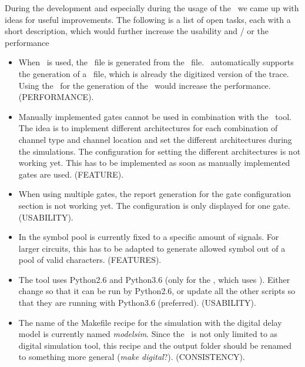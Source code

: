 During the development and especially during the usage of the \invt\, we came 
up with ideas for useful improvements. 
The following is a list of open tasks, each with a short description, which 
would further increase the usability and / or the performance

\begin{itemize}
	\item When \hspice\ is used, the \crossingsjson\ file is 
	generated from the \trfile\ file. \hspice\ automatically supports the 
	generation of a \vcdfile\ file, which is already the digitized version of 
	the trace. Using the \vcdfile\ for the generation of the \crossingsjson\ 
	would increase the performance. (PERFORMANCE).
	
	\item Manually implemented gates cannot be used in combination with the 
	\multiexec\ tool. The idea is to implement different architectures for 
	each combination of channel type and channel location and set the 
	different architectures during the simulations. The configuration for 
	setting the different architectures is not working yet. This has to be 
	implemented as soon as manually implemented gates are used. (FEATURE).
	
	\item When using multiple gates, the report generation for the gate 
	configuration section is not working yet. The configuration is only 
	displayed for one gate. (USABILITY).
	
	\item In  the symbol pool is currently fixed to a specific 
	amount of signals. For larger circuits, this has to be adapted to generate 
	allowed symbol out of a pool of valid characters. (FEATURES).
	
	\item The tool uses Python2.6 and Python3.6 (only for the , 
	which uses ). Either change \file{rawread.py} so that it 
	can be run by Python2.6, or update all the other scripts so that they are 
	running with Python3.6 (preferred). (USABILITY).
	
	\item The name of the Makefile recipe for the simulation with the digital 
	delay model is currently named \emph{modelsim}. Since the \invt\ is not 
	only limited to \modelsim as digital simulation tool, this recipe and the 
	output folder should be renamed to something more general (\emph{make 
	digital}?). (CONSISTENCY).
	

\end{itemize}
